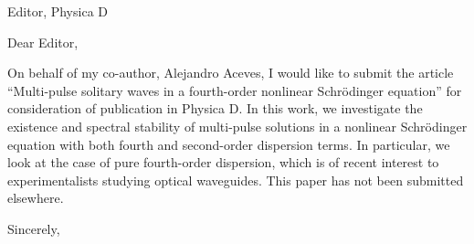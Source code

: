 \documentclass[11pt]{letter}
\begin{document}
\address{Ross Parker \\
Department of Mathematics \\
Southern Methodist University \\
Dallas, TX 75275 \\
\texttt{rhparker@smu.edu}}%
\signature{Ross Parker}
\begin{letter}{Editor, Physica D}

\opening{Dear Editor,}

On behalf of my co-author, Alejandro Aceves, I would like to submit the article ``Multi-pulse solitary waves in a fourth-order nonlinear {S}chr{\"o}dinger equation'' for consideration of publication in Physica D. In this work, we investigate the existence and spectral stability of multi-pulse solutions in a nonlinear {S}chr{\"o}dinger equation with both fourth and second-order dispersion terms. In particular, we look at the case of pure fourth-order dispersion, which is of recent interest to experimentalists studying optical waveguides. This paper has not been submitted elsewhere.

\closing{Sincerely,}

\end{letter}
\end{document}

